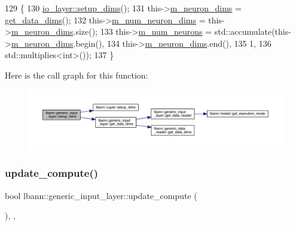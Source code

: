 \begin{DoxyCode}
129                              \{
130     \hyperlink{classlbann_1_1Layer_a90fce1b06c1f2abb480e18cfe08a9746}{io\_layer::setup\_dims}();
131     this->\hyperlink{classlbann_1_1Layer_abb34bb8031f57a483e2e327a5f229f48}{m\_neuron\_dims} = \hyperlink{classlbann_1_1generic__input__layer_a6008b13521d27d6139201fa374b088eb}{get\_data\_dims}();
132     this->\hyperlink{classlbann_1_1Layer_adfd6178d21498c9095cd947ae1eb2d6a}{m\_num\_neuron\_dims} = this->\hyperlink{classlbann_1_1Layer_abb34bb8031f57a483e2e327a5f229f48}{m\_neuron\_dims}.size();
133     this->\hyperlink{classlbann_1_1Layer_a6b5ebc8a7d9329d8a773ed787e7b41d8}{m\_num\_neurons} = std::accumulate(this->\hyperlink{classlbann_1_1Layer_abb34bb8031f57a483e2e327a5f229f48}{m\_neuron\_dims}.begin(),
134                                           this->\hyperlink{classlbann_1_1Layer_abb34bb8031f57a483e2e327a5f229f48}{m\_neuron\_dims}.end(),
135                                           1,
136                                           std::multiplies<int>());
137   \}
\end{DoxyCode}
Here is the call graph for this function\+:\nopagebreak
\begin{figure}[H]
\begin{center}
\leavevmode
\includegraphics[width=350pt]{classlbann_1_1generic__input__layer_ad117da4e6155159439826bba6657cf05_cgraph}
\end{center}
\end{figure}
\mbox{\label{classlbann_1_1generic__input__layer_aaf9ac19f7dd725230bde87d859ec0f35}} 
\subsubsection{\texorpdfstring{update\+\_\+compute()}{update\_compute()}}
{\footnotesize\ttfamily bool lbann\+::generic\+\_\+input\+\_\+layer\+::update\+\_\+compute (\begin{DoxyParamCaption}{ }\end{DoxyParamCaption})\hspace{0.3cm}{\ttfamily [inline]}, {\ttfamily [override]}, {\ttfamily [virtual]}}

